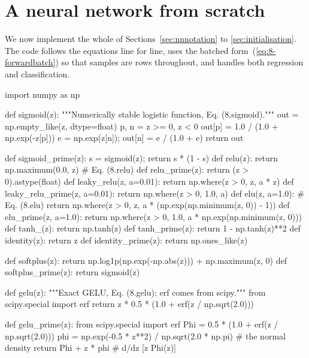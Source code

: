 
\section{A neural network from scratch}
\label{sec:nncode}

We now implement the whole of Sections~\ref{sec:nnnotation} to
\ref{sec:initialisation}.  The code follows the equations line for line, uses
the batched form~(\ref{eq:8-forwardbatch}) so that samples are rows throughout,
and handles both regression and classification.

\begin{Python}{}
import numpy as np


def sigmoid(z):
    """Numerically stable logistic function, Eq. (8.sigmoid)."""
    out = np.empty_like(z, dtype=float)
    p, n = z >= 0, z < 0
    out[p] = 1.0 / (1.0 + np.exp(-z[p]))
    e = np.exp(z[n]); out[n] = e / (1.0 + e)
    return out

def sigmoid_prime(z):  s = sigmoid(z); return s * (1 - s)
def relu(z):           return np.maximum(0.0, z)            # Eq. (8.relu)
def relu_prime(z):     return (z > 0).astype(float)
def leaky_relu(z, a=0.01):        return np.where(z > 0, z, a * z)
def leaky_relu_prime(z, a=0.01):  return np.where(z > 0, 1.0, a)
def elu(z, a=1.0):                                          # Eq. (8.elu)
    return np.where(z > 0, z, a * (np.exp(np.minimum(z, 0)) - 1))
def elu_prime(z, a=1.0):
    return np.where(z > 0, 1.0, a * np.exp(np.minimum(z, 0)))
def tanh_(z):          return np.tanh(z)
def tanh_prime(z):     return 1 - np.tanh(z)**2
def identity(z):       return z
def identity_prime(z): return np.ones_like(z)

def softplus(z):       return np.log1p(np.exp(-np.abs(z))) + np.maximum(z, 0)
def softplus_prime(z): return sigmoid(z)

def gelu(z):
    """Exact GELU, Eq. (8.gelu); erf comes from scipy."""
    from scipy.special import erf
    return z * 0.5 * (1.0 + erf(z / np.sqrt(2.0)))

def gelu_prime(z):
    from scipy.special import erf
    Phi = 0.5 * (1.0 + erf(z / np.sqrt(2.0)))
    phi = np.exp(-0.5 * z**2) / np.sqrt(2.0 * np.pi)      # the normal density
    return Phi + z * phi                                   # d/dz [z Phi(z)]


\end{Python}
